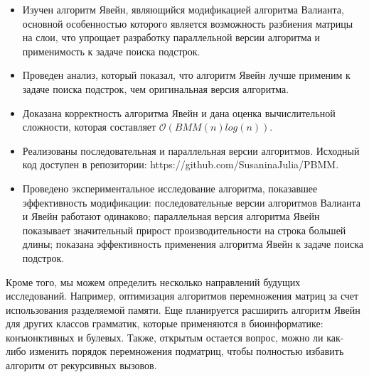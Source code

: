 \documentclass[14pt]{matmex-diploma-custom}
\begin{document}
\begin{itemize}
	\item Изучен алгоритм Явейн, являющийся модификацией алгоритма Валианта, основной особенностью которого является возможность разбиения матрицы на слои, что упрощает разработку параллельной версии алгоритма и применимость к задаче поиска подстрок.  
	\item Проведен анализ, который показал, что алгоритм Явейн лучше применим к задаче поиска подстрок, чем оригинальная версия алгоритма.
	\item Доказана корректность алгоритма Явейн и дана оценка вычислительной сложности, которая составляет $\mathcal{O}(BMM(n)log(n))$.
	\item Реализованы последовательная и параллельная версии алгоритмов. Исходный код доступен в репозитории: https://github.com/SusaninaJulia/PBMM.
	\item Проведено экспериментальное исследование алгоритма, показавшее эффективность модификации: последовательные версии алгоритмов Валианта и Явейн работают одинаково; параллельная версия алгоритма Явейн показывает значительный прирост производительности на строка большей длины; показана эффективность применения алгоритма Явейн к задаче поиска подстрок.
\end{itemize}

Кроме того, мы можем определить несколько направлений будущих исследований. 
Например, оптимизация алгоритмов перемножения матриц за счет использования разделяемой памяти.
Еще планируется расширить алгоритм Явейн для других классов грамматик, которые применяются в биоинформатике: конъюнктивных и булевых.
Также, открытым остается вопрос, можно ли как-либо изменить порядок перемножения подматриц, чтобы полностью избавить алгоритм от рекурсивных вызовов.

\setmonofont[Mapping=tex-text]{CMU Typewriter Text}


\end{document}
